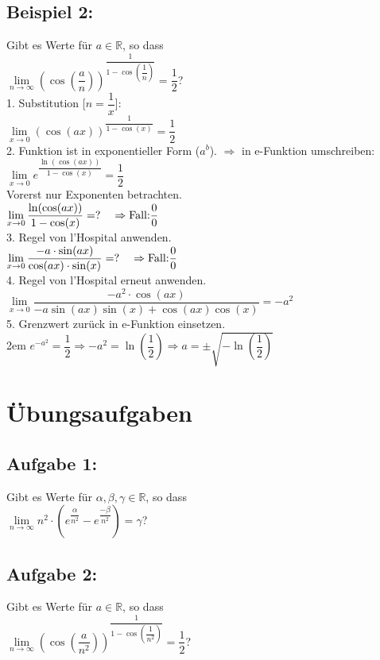\documentclass[11pt,final]{scrreprt}
\newcommand{\br} {\medskip\\}
\newcommand{\gbr} {\bigskip\\}
\newcommand{\R} {\mathbb R}
\begin{document}
\subsection*{Beispiel 2: }
Gibt es Werte für $ a\in\R$, so dass \br
\hspace*{2em}$ \lim\limits_{n\to\infty} (\cos(\dfrac{a}{n}))^{\dfrac{1}{1-\cos(\dfrac{1}{n})}} = \dfrac{1}{2}$?\gbr
1. Substitution [$ n=\dfrac{1}{x} $]:\br
\hspace*{2em}$ \lim\limits_{x\to 0} (\cos({a}{x}))^{\dfrac{1}{1-\cos({x})}}= \dfrac{1}{2}$\br
2. Funktion ist in exponentieller Form ($a^b$). $\Rightarrow$ in e-Funktion umschreiben:\br
\hspace*{2em}$ \lim\limits_{x\to 0} e^{\dfrac{\ln(\cos({a}{x}))}{1-\cos({x})}}= \dfrac{1}{2}$\br
Vorerst nur Exponenten betrachten.\br
\hspace*{2em}$ \lim\limits_{x\to 0} {\dfrac{\ln(\cos({a}{x}))}{1-\cos({x})}}= ? \hspace*{1em} \Rightarrow \text{Fall:}\dfrac{0}{0}$\br
3. Regel von l'Hospital anwenden.\br
\hspace*{2em}$ \lim\limits_{x\to 0} {\dfrac{-a\cdot \sin(ax)}{\cos(ax)\cdot\sin(x)}}= ? \hspace*{1em} \Rightarrow \text{Fall:}\dfrac{0}{0}$\br
4. Regel von l'Hospital erneut anwenden.\br
\hspace*{2em}$ \lim\limits_{x\to 0} {\dfrac{-a^2\cdot \cos(ax)}{-a\sin(ax)\sin(x)+\cos(ax)\cos(x)}}= -a^2$\br
5. Grenzwert zurück in e-Funktion einsetzen.\\

\begingroup
\leftskip2em 
$e^{-a^2}=\dfrac{1}{2} \Rightarrow -a^2=\ln(\dfrac{1}{2}) \Rightarrow a=\pm\sqrt{-\ln(\dfrac{1}{2})}$
\par	
\endgroup 

\newpage
\section{Übungsaufgaben}

\subsection*{Aufgabe 1: }
Gibt es Werte für $\alpha, \beta, \gamma \in\R$, so dass \br
\hspace*{2em}$ \lim\limits_{n\to\infty} n^2\cdot\left( e^{\dfrac{\alpha}{n^2}}- e^{\dfrac{-\beta}{n^2}}\right) = \gamma $?
\subsection*{Aufgabe 2: }
Gibt es Werte für $ a\in\R$, so dass \br
\hspace*{2em}$ \lim\limits_{n\to\infty} (\cos(\dfrac{a}{n^2}))^{\dfrac{1}{1-\cos(\dfrac{1}{n^2})}} = \dfrac{1}{2}$?
\end{document}
